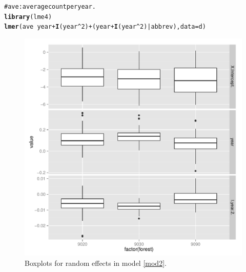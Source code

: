 \documentclass{article}\usepackage{graphicx, color}
\makeatletter
\newcommand{\hlfunctioncall}[1]{\textcolor[rgb]{0.501960784313725,0,0.329411764705882}{\textbf{#1}}}%
\newcommand{\hlcomment}[1]{\textcolor[rgb]{0.180392156862745,0.6,0.341176470588235}{#1}}%
\newenvironment{kframe}{%
 \def\at@end@of@kframe{}%
 \ifinner\ifhmode%
  \def\at@end@of@kframe{\end{minipage}}%
  \begin{minipage}{\columnwidth}%
 \fi\fi%
 \def\FrameCommand##1{\hskip\@totalleftmargin \hskip-\fboxsep
 \colorbox{shadecolor}{##1}\hskip-\fboxsep
     \hskip-\linewidth \hskip-\@totalleftmargin \hskip\columnwidth}%
 \MakeFramed {\advance\hsize-\width
   \@totalleftmargin\z@ \linewidth\hsize
   \@setminipage}}%
 {\par\unskip\endMakeFramed%
 \at@end@of@kframe}
\newenvironment{knitrout}{}{} %
\makeatother
\begin{document}
\begin{knitrout}
\color{fgcolor}\begin{kframe}
\begin{alltt}
\hlcomment{# ave : average count per year.}
\hlfunctioncall{library}(lme4)
\hlfunctioncall{lmer}(ave ~ year + \hlfunctioncall{I}(year^2) + (year + \hlfunctioncall{I}(year^2) | abbrev), data = d)
\end{alltt}
\end{kframe}
\end{knitrout}



\begin{figure}
\centering
\includegraphics[scale=.45]{box_m2.pdf}
\caption{Boxplots for random effects in model \ref{mod2}. \label{boxm2}}
\end{figure}
\end{document}
